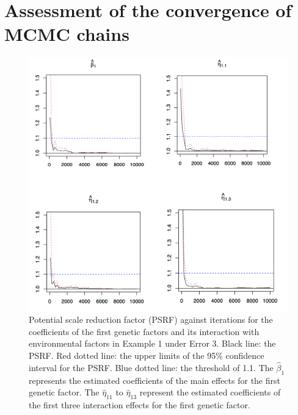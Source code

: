 \documentclass[12pt]{article}
\begin{document}
\section{{Assessment of the convergence of MCMC chains}}
\begin{figure}[h!]
	\centering

	\includegraphics[angle=0,origin=c,width=1\textwidth]{figures/PSRF}
	\caption[Potential scale reduction factor against iterations]{{Potential scale reduction factor (PSRF) against iterations for the coefficients of the first genetic factors and its interaction with environmental factors in Example 1 under Error 3. Black line: the PSRF. 
			Red dotted line: the upper limits of the 95\%  confidence interval for the PSRF. 
Blue dotted line: the threshold of 1.1. The $\hat{\beta}_{1}$ represents the estimated coefficients of the main effects for the first genetic factor. The $\hat{\eta}_{11}$ to $\hat{\eta}_{13}$ represent the estimated coefficients of the first three interaction effects for the first genetic factor.}}
	\label{fig:psrf}
\end{figure}
\end{document}
